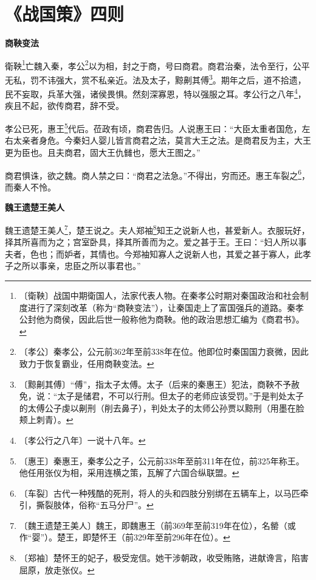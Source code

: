 \documentclass[12pt,UTF-8,openany,a4]{ctexbook}
\begin{document}
\chapter{《战国策》四则}

\begin{large}
    
    \begin{center}{\Large\textbf{商鞅变法}}\end{center}
    
    衛鞅\footnote{〔衛鞅〕\yiwen 战国中期衛国人，法家代表人物。在秦孝公时期对秦国政治和社会制度进行了深刻改革（称为“商鞅变法”），让秦国走上了富国强兵的道路。秦孝公封他为商侯，因此后世一般称他为商鞅。他的政治思想汇编为《商君书》。}亡魏入秦，孝公\footnote{〔孝公〕\yiwen 秦孝公，公元前362年至前338年在位。他即位时秦国国力衰微，因此致力于恢复霸业，任用商鞅变法。}以为相，封之于商，号曰商君。商君治秦，法令至行，公平无私，罚不讳强大，赏不私亲近。法及太子，黥劓其傅\footnote{〔黥劓其傅〕\yiwen “傅”，指太子太傅。太子（后来的秦惠王）犯法，商鞅不予赦免，说：“太子是储君，不可以行刑。但太子的老师应该受罚。”于是判处太子的太傅公子虔以劓刑（削去鼻子），判处太子的太师公孙贾以黥刑（用墨在脸颊上刺青）。}。期年之后，道不拾遗，民不妄取，兵革大强，诸侯畏惧。然刻深寡恩，特以强服之耳。孝公行之八年\footnote{〔孝公行之八年〕\yiwen 一说十八年。}，疾且不起，欲传商君，辞不受。
    
    孝公已死，惠王\footnote{〔惠王〕\yiwen 秦惠王，秦孝公之子，公元前338年至前311年在位，前325年称王。他任用张仪为相，采用连横之策，瓦解了六国合纵联盟。}代后。莅政有顷，商君告归。人说惠王曰：“大臣太重者国危，左右太亲者身危。今秦妇人婴儿皆言商君之法，莫言大王之法。是商君反为主，大王更为臣也。且夫商君，固大王仇雠也，愿大王图之。”
    
    商君惧诛，欲之魏。商人禁之曰：“商君之法急。”不得出，穷而还。惠王车裂之\footnote{〔车裂〕\yiwen 古代一种残酷的死刑，将人的头和四肢分别绑在五辆车上，以马匹牵引，撕裂肢体，俗称“五马分尸”。}，而秦人不怜。
    
    \begin{center}{\Large\textbf{魏王遗楚王美人}}\end{center}
    
    魏王遗楚王美人\footnote{〔魏王遗楚王美人〕\yiwen 魏王，即魏惠王（前369年至前319年在位），名罃（或作“婴”）。楚王，即楚怀王（前329年至前296年在位）。}，楚王说之。夫人郑袖\footnote{〔郑袖〕\yiwen 楚怀王的妃子，极受宠信。她干涉朝政，收受贿赂，进献谗言，陷害屈原，放走张仪。}知王之说新人也，甚爱新人。衣服玩好，择其所喜而为之；宫室卧具，择其所善而为之。爱之甚于王。王曰：“妇人所以事夫者，色也；而妒者，其情也。今郑袖知寡人之说新人也，其爱之甚于寡人，此孝子之所以事亲，忠臣之所以事君也。”
    

\end{large}
\end{document}
